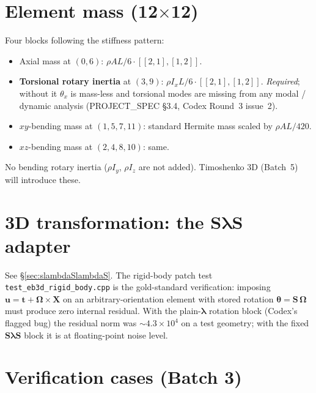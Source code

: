 \documentclass[11pt,a4paper]{book}
\newcommand{\bmath}[1]{\boldsymbol{#1}}
\newcommand{\Sdiag}{\bmath{S}}
\newcommand{\lam}{\bmath{\lambda}}
\begin{document}
\section{Element mass (12\texorpdfstring{$\times$}{x}12)}

Four blocks following the stiffness pattern:
\begin{itemize}
    \item Axial mass at $(0, 6)$: $\rho A L / 6 \cdot [[2,1],[1,2]]$.
    \item \textbf{Torsional rotary inertia} at $(3, 9)$: $\rho I_x L / 6 \cdot [[2,1],[1,2]]$. \emph{Required}; without it $\theta_x$ is mass-less and torsional modes are missing from any modal / dynamic analysis (PROJECT\_SPEC \S3.4, Codex Round~3 issue~2).
    \item $xy$-bending mass at $(1, 5, 7, 11)$: standard Hermite mass scaled by $\rho A L / 420$.
    \item $xz$-bending mass at $(2, 4, 8, 10)$: same.
\end{itemize}
No bending rotary inertia ($\rho I_y$, $\rho I_z$ are not added). Timoshenko 3D (Batch~5) will introduce these.

\section{3D transformation: the \texorpdfstring{$\Sdiag\lam\Sdiag$}{S lambda S} adapter}

See \S\ref{sec:slambdaSlambdaS}. The rigid-body patch test \texttt{test\_eb3d\_rigid\_body.cpp} is the gold-standard verification: imposing $\bmath{u} = \bmath{t} + \bmath{\Omega}\times\bmath{X}$ on an arbitrary-orientation element with stored rotation $\bmath{\theta} = \Sdiag\,\bmath{\Omega}$ must produce zero internal residual. With the plain-$\lam$ rotation block (Codex's flagged bug) the residual norm was $\sim 4.3 \times 10^4$ on a test geometry; with the fixed $\Sdiag\lam\Sdiag$ block it is at floating-point noise level.

\section{Verification cases (Batch 3)}\label{sec:eb3d-verification}
\end{document}
